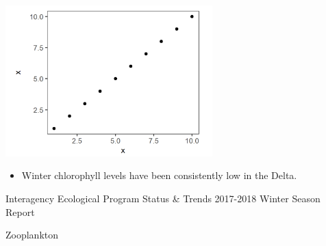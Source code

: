 \documentclass[]{article}\usepackage[]{graphicx}\usepackage[]{color}
\begin{document}
\begin{Row}
  \begin{Cell}{4}
    \begin{center}
      \includegraphics[width=8cm,align=m]{figures/chlorophyll/placeholder_fig.png}
      \vspace{0.5cm}
      \begin{itemize}[leftmargin=1.5cm,rightmargin=1cm]
        \item Winter chlorophyll levels have been consistently low in the Delta.
      \end{itemize}
    \end{center}
  \end{Cell}
\end{Row}


\newpage


\hypertarget{page:zooplankton}{}
\begin{Row}
  \begin{Cell}{1}
    \begin{center}
      {\Large Interagency Ecological Program Status \& Trends 2017-2018 Winter Season Report}
    \end{center}
  \end{Cell}
\end{Row}

\begin{Row}
  \begin{Cell}{1}
    \begin{center}
      {\Huge Zooplankton}
    \end{center}
  \end{Cell}
\end{Row}
\end{document}
